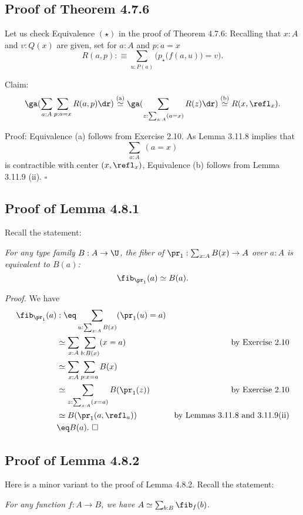 \documentclass[12pt]{article}
\begin{document}
\subsection{Proof of Theorem 4.7.6}

Let us check Equivalence $(\star)$ in the proof of Theorem 4.7.6: Recalling that $x:A$ and $v:Q(x)$ are given, set for $a:A$ and $p:a=x$ 
$$
R(a,p):\equiv\sum_{u:P(a)}\Big(p_\star\big(f(a,u)\big)=v\Big).
$$ 

Claim: 
$$
\ga(\sum_{a:A}\sum_{p:a=x}R(a,p)\dr)\overset{(\text a)}{\simeq}
\ga(\sum_{z:\sum_{a:A}(a=x)}R(z)\dr)\overset{(\text b)}{\simeq}
R(x,\refl_x).
$$

Proof: Equivalence (a) follows from Exercise 2.10. As Lemma 3.11.8 implies that 
$$
\sum_{a:A}\ (a=x)
$$ 
is contractible with center $(x,\refl_x)$, Equivalence (b) follows from Lemma 3.11.9 (ii). $\square$


\subsection{Proof of Lemma 4.8.1}%

Recall the statement:

\emph{For any type family $B:A\to\U$, the fiber of $\pr_1:\sum_{x:A}B(x)\to A$ over $a:A$ is equivalent to $B(a)$:}
$$
\fib_{\pr_1}(a)\simeq B(a).
$$

\nn\emph{Proof.} We have
\begin{align*}
\fib_{\pr_1}(a)&:\eq\sum_{u:\sum_{x:A}B(x)}(\pr_1(u)=a)\\
&\simeq\sum_{x:A}\sum_{b:B(x)}(x=a)&\text{by Exercise 2.10}\\
&\simeq\sum_{x:A}\sum_{p:x=a}B(x)\\
&\simeq\sum_{z:\sum_{x:A}(x=a)}B(\pr_1(z))&\text{by Exercise 2.10}\\
&\simeq B(\pr_1(a,\refl_a))&\text{by Lemmas 3.11.8 and 3.11.9(ii)}\\
&\eq B(a).\ \square
\end{align*}


\subsection{Proof of Lemma 4.8.2}\label{482}

Here is a minor variant to the proof of Lemma 4.8.2. Recall the statement:

\emph{For any function $f:A\to B$, we have} $A\simeq\sum_{b:B}\fib_f(b)$.
\end{document}
